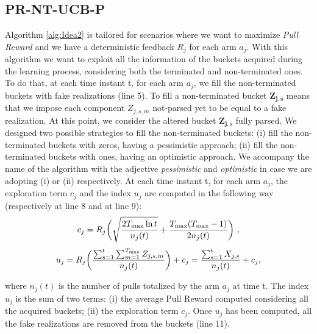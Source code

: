 \subsection{PR-NT-UCB-P}
Algorithm \ref{alg:Idea2} is tailored for scenarios where we want to maximize \emph{Pull Reward} and we have a deterministic feedback $R_j$ for each arm $a_j$. With this algorithm we want to exploit all the information of the buckets acquired during the learning process, considering both the terminated and non-terminated ones. To do that, at each time instant t, for each arm $a_j$, we fill the non-terminated buckets with fake realizations (line 5). To fill a non-terminated bucket $\boldsymbol{Z_{j,s}}$ means that we impose each component $Z_{j,s,m}$ not-parsed yet to be equal to a fake realization. At this point, we consider the altered bucket $\boldsymbol{Z_{j,s}}$ fully parsed. We designed two possible strategies to fill the non-terminated buckets: (i)
fill the non-terminated buckets with zeros, having a pessimistic approach; (ii) fill the non-terminated buckets with ones, having an optimistic approach. We accompany the name of the algorithm with the adjective \emph{pessimistic} and \emph{optimistic} in case we are adopting (i) or (ii) respectively. At each time instant t, for each arm $a_j$, the exploration term $c_j$ and the index $u_j$ are computed in the following way (respectively at line 8 and at line 9):
$$c_j = R_j \bigg( \sqrt{\frac{2T_{\textnormal{max}}\ln{t}}{n_j(t)}} + \frac{T_{\textnormal{max}}(T_{\textnormal{max}}-1)}{2n_j(t)} \bigg) \ ,$$ 
$$
u_j = R_j \bigg( \frac{\sum_{s=1}^{t}\sum_{m=1}^{T_{\textnormal{max}}}Z_{j,s,m}}{n_j(t)}\bigg)+c_j   = \frac{\sum_{s=1}^{t} X_{j,s}}{n_j(t)} +c_j  ,
$$

where $n_j(t)$ is the number of pulls totalized by the arm $a_j$ at time t. The index $u_j$ is the sum of two terms: (i) the average Pull Reward computed considering all the acquired buckets; (ii) the exploration term  $c_j$. Once $u_j$ has been computed, all the fake realizations are removed from the buckets (line 11).

